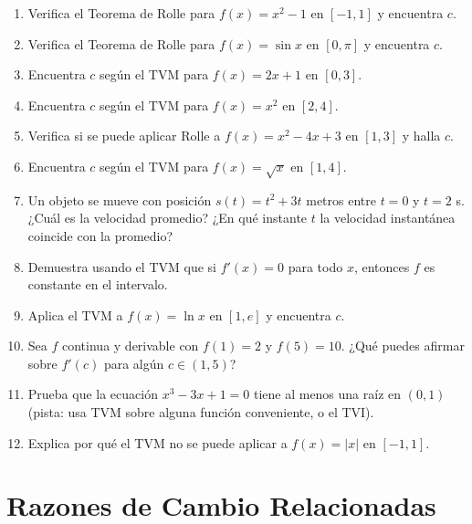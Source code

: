 \documentclass[12pt, a4paper]{article}
\begin{document}
\begin{enumerate}[leftmargin=*, resume]
  \item \facil{} Verifica el Teorema de Rolle para $f(x) = x^2 - 1$ en $[-1, 1]$ y encuentra $c$.

  \item \facil{} Verifica el Teorema de Rolle para $f(x) = \sin x$ en $[0, \pi]$ y encuentra $c$.

  \item \facil{} Encuentra $c$ según el TVM para $f(x) = 2x + 1$ en $[0, 3]$.

  \item \facil{} Encuentra $c$ según el TVM para $f(x) = x^2$ en $[2, 4]$.

  \item \medio{} Verifica si se puede aplicar Rolle a $f(x) = x^2 - 4x + 3$ en $[1, 3]$ y halla $c$.

  \item \medio{} Encuentra $c$ según el TVM para $f(x) = \sqrt{x}$ en $[1, 4]$.

  \item \medio{} Un objeto se mueve con posición $s(t) = t^2 + 3t$ metros entre $t = 0$ y $t = 2$ s. ¿Cuál es la velocidad promedio? ¿En qué instante $t$ la velocidad instantánea coincide con la promedio?

  \item \medio{} Demuestra usando el TVM que si $f'(x) = 0$ para todo $x$, entonces $f$ es constante en el intervalo.

  \item \dificil{} Aplica el TVM a $f(x) = \ln x$ en $[1, e]$ y encuentra $c$.

  \item \dificil{} Sea $f$ continua y derivable con $f(1) = 2$ y $f(5) = 10$. ¿Qué puedes afirmar sobre $f'(c)$ para algún $c \in (1, 5)$?

  \item \dificil{} Prueba que la ecuación $x^3 - 3x + 1 = 0$ tiene al menos una raíz en $(0, 1)$ (pista: usa TVM sobre alguna función conveniente, o el TVI).

  \item \dificil{} Explica por qué el TVM no se puede aplicar a $f(x) = |x|$ en $[-1, 1]$.
\end{enumerate}


\section{Razones de Cambio Relacionadas}
\end{document}
